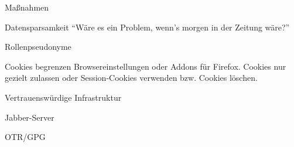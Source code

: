 \begin{frame}{Maßnahmen}
\end{frame}

\begin{frame}{Datensparsamkeit}
"`Wäre es ein Problem, wenn's morgen in der Zeitung wäre?"'
\end{frame}

\begin{frame}{Rollenpseudonyme}
\end{frame}

\begin{frame}{Cookies begrenzen}
	Browsereinstellungen oder Addons f\"ur Firefox.
	Cookies nur gezielt zulassen oder Session-Cookies verwenden bzw. Cookies l\"oschen.
\end{frame}

\begin{frame}{Vertrauenswürdige Infrastruktur}

Jabber-Server

OTR/GPG

\end{frame}


